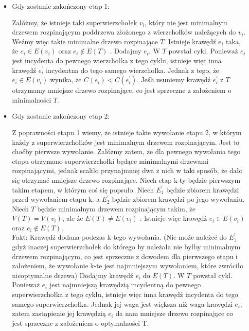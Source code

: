 \documentclass[svgnames]{report}
\begin{document}
\begin{itemize}
\item Gdy zostanie zakończony etap 1:

Załóżmy, że istnieje taki superwierzchołek $v_i$, który nie jest minimalnym drzewem rozpinającym poddrzewa złożonego z wierzchołków należących do $v_i$. Weźmy więc takie minimalne drzewo rozpinające $T$. Istnieje krawędź $e_i$ taka, że $e_i \in E(v_i)$ oraz $e_i \not\in E(T)$ . Dodajmy $e_i$. W $T$ powstał cykl. Ponieważ $e_i$ jest incydenta do pewnego wierzchołka z tego cyklu, istnieje więc inna krawędź $e^\prime_i$ incydentna do tego samego wierzchołka. Jednak z tego, że $e_i \in E(v_i)$ wynika, że $C(e_i) < C(e^\prime_i)$. Jeśli usuniemy krawędź $e^\prime_i$ z $T$ otrzymamy mniejsze drzewo rozpinające, co jest sprzeczne z założeniem o minimalności $T$.

\item Gdy zostanie zakończony etap 2:

Z poprawności etapu 1 wiemy, że istnieje takie wywołanie etapu 2, w którym każdy z superwierzchołków jest minimalnym drzewem rozpinającym. Jest to choćby pierwsze wywołanie. Załóżmy zatem, że dla pewnego wywołania tego etapu otrzymano superwierzchołki będące minimalnymi drzewami rozpinającymi, jednak scaliło przynajmniej dwa z nich w taki sposób, że dało się otrzymać mniejsze drzewo rozpinające. Niech etap k-ty będzie pierwszym takim etapem, w którym coś się popsuło. Niech $E^\prime_1$ będzie zbiorem krawędzi przed wywołaniem etapu k, a $E^\prime_2$ będzie zbiorem krawędzi po jego wywołaniu. Niech $T$ będzie minimalnym drzewem rozpinającym takim, że $V(T) = V(v_i)$, ale że $E(T) \neq E(v_i)$ . Istnieje więc krawędź $e_i \in E(v_i)$ oraz $e_i \not\in E(T)$.\\

Fakt: Krawędź  dodana podczas k-tego wywołania. (Nie może należeć do $E^\prime_1$ gdyż inaczej superwierzchołek do którego by należała nie byłby minimalnym drzewem rozpinającym, co jest sprzeczne z dowodem dla pierwszego etapu i założeniem, że wywołanie k-te jest najmniejszym wywołaniem, które zwróciło nieoptymalne drzewa)
Dodajmy krawędź $e_i$ do $E(T)$. W $T$ powstał cykl. Ponieważ $e_i$ jest najmniejszą krawędzią incydentną do pewnego superwierzchołka z tego cyklu, istnieje więc inna krawędź incydenta do tego samego superwierzchołka. Jednak jej waga jest większa niż waga krawędzi $e_i$, zatem zastąpienie jej krawędzią $e_i$ da nam mniejsze drzewo rozpinające co jest sprzeczne z założeniem o optymalności T.
\end{itemize}
\end{document}

